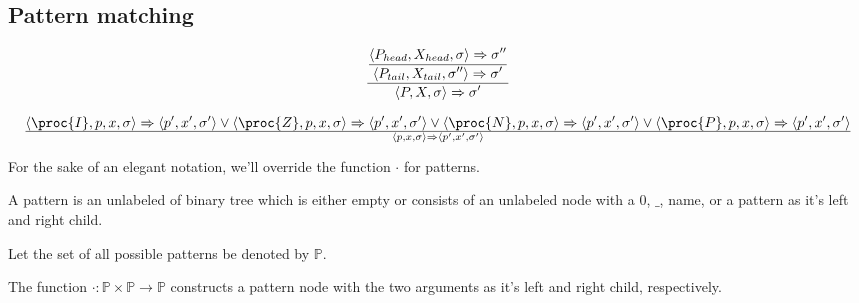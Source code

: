 \subsection{Pattern matching}

\begin{equation}
{\displaystyle
{\displaystyle
  \left\langle P_{head}, X_{head}, \sigma\right\rangle
  \Rightarrow
  \sigma''
\over\displaystyle
  \left\langle P_{tail}, X_{tail}, \sigma''\right\rangle
  \Rightarrow
  \sigma'
}
\over\displaystyle
  \left\langle P, X, \sigma\right\rangle
  \Rightarrow
  \sigma'
}
\end{equation}

\begin{equation}
{
  \left\langle\proc{I}, p,x,\sigma\right\rangle
  \Rightarrow
  \left\langle p',x',\sigma'\right\rangle
\vee
  \left\langle\proc{Z}, p,x,\sigma\right\rangle
  \Rightarrow
  \left\langle p',x',\sigma'\right\rangle
\vee
  \left\langle\proc{N}, p,x,\sigma\right\rangle
  \Rightarrow
  \left\langle p',x',\sigma'\right\rangle
\vee
  \left\langle\proc{P}, p,x,\sigma\right\rangle
  \Rightarrow
  \left\langle p',x',\sigma'\right\rangle
}\over{
  \left\langle p, x, \sigma\right\rangle
  \Rightarrow
  \left\langle p', x', \sigma'\right\rangle
}
\end{equation}

For the sake of an elegant notation, we'll override the function $\cdot$ for
patterns.

\begin{definition}

A pattern is an unlabeled of binary tree which is either empty or consists of
an unlabeled node with a $0$, $\_$, name, or a pattern as it's left and right
child. 

\end{definition}

\begin{definition}

Let the set of all possible patterns be denoted by $\mathbb{P}$.

\end{definition}

\begin{definition}

The function $\cdot
:\mathbb{P}\times\mathbb{P}\rightarrow\mathbb{P}$ constructs a pattern node with the
two arguments as it's left and right child, respectively. 

\end{definition}


